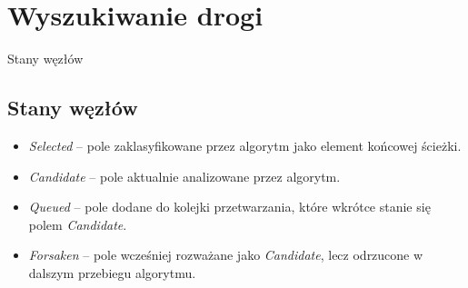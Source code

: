 \documentclass[../../doc.tex]{subfiles}
\begin{document}
\section{Wyszukiwanie drogi}

Stany węzłów

\subsection{Stany węzłów}
\label{sec:node_states}

\begin{itemize}
  \item \textit{Selected} -- pole zaklasyfikowane przez algorytm jako element końcowej ścieżki.
  \item \textit{Candidate} -- pole aktualnie analizowane przez algorytm.
  \item \textit{Queued} -- pole dodane do kolejki przetwarzania, które wkrótce stanie się polem \textit{Candidate}.
  \item \textit{Forsaken} -- pole wcześniej rozważane jako \textit{Candidate}, lecz odrzucone w dalszym przebiegu algorytmu.
\end{itemize}
\end{document}
